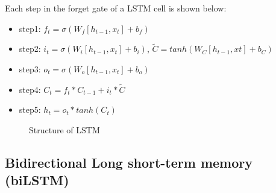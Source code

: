 \documentclass{article}
\begin{document}
Each step in the forget gate of a LSTM cell is shown below:
\begin{itemize}
\item step1: $f_t = \sigma(W_f[h_{t-1}, x_t] + b_f)$
\item step2: $i_t = \sigma(W_i[h_{t-1}, x_t] + b_i)$,  $\widetilde{C} = tanh(W_C[h_{t-1}, xt] + b_C)$
\item step3: $o_t=\sigma(W_o[h_{t-1}, x_t] + b_o)$
\item step4: $C_t = f_t*C_{t-1} + i_t*\widetilde{C}$
\item step5: $h_t=o_t*tanh(C_t)$
\end{itemize}
\begin{figure}[h]
  \centering
  \caption{Structure of LSTM}
\end{figure}


\subsection{Bidirectional Long short-term memory (biLSTM)}
\end{document}

